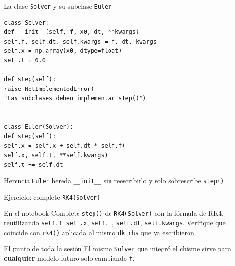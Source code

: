 \documentclass[aspectratio=169,10pt]{beamer}
\begin{document}
	\begin{frame}[fragile]{La clase \texttt{Solver} y su subclase \texttt{Euler}}
		\vspace{2pt}
\begin{lstlisting}
class Solver:
def __init__(self, f, x0, dt, **kwargs):
self.f, self.dt, self.kwargs = f, dt, kwargs
self.x = np.array(x0, dtype=float)
self.t = 0.0

def step(self):
raise NotImplementedError(
"Las subclases deben implementar step()")


class Euler(Solver):
def step(self):
self.x = self.x + self.dt * self.f(
self.x, self.t, **self.kwargs)
self.t += self.dt
\end{lstlisting}
		
		\vspace{4pt}
		\begin{resultbox}{Herencia}
			\texttt{Euler} hereda \texttt{\_\_init\_\_} sin reescribirlo y solo
			sobrescribe \texttt{step()}.
		\end{resultbox}
	\end{frame}
	
	\begin{frame}{Ejercicio: complete \texttt{RK4(Solver)}}
		\vspace{4pt}
		\begin{taskbox}{En el notebook}
			Complete \texttt{step()} de \texttt{RK4(Solver)} con la f\'ormula
			de RK4, reutilizando \texttt{self.f}, \texttt{self.x}, \texttt{self.t},
			\texttt{self.dt}, \texttt{self.kwargs}. Verifique que coincide con
			\texttt{rk4()} aplicada al mismo \texttt{dk\_rhs} que ya escribieron.
		\end{taskbox}
		
		\vspace{10pt}
		\begin{obsbox}{El punto de toda la sesi\'on}
			El mismo \texttt{Solver} que integr\'o el chisme sirve para
			\textbf{cualquier} modelo futuro solo cambiando \texttt{f}.
		\end{obsbox}
	\end{frame}
	
\end{document}
